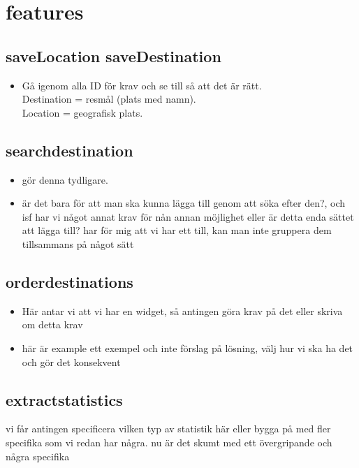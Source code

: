 \documentclass[a4paper]{article}
\begin{document}
\section{features}

	\subsection{saveLocation saveDestination}
		\begin{itemize}
			\item Gå igenom alla ID för krav och se till så att det är rätt.
			\\Destination = resmål (plats med namn).
			\\Location = geografisk plats.
		\end{itemize}


	\subsection{searchdestination}
		\begin{itemize}
			\item gör denna tydligare. 
			\item är det bara för att man ska kunna lägga till genom att söka efter den?, och isf har vi något annat krav för nån annan möjlighet eller är detta enda sättet att lägga till? har för mig att vi har ett till, kan man inte gruppera dem tillsammans på något sätt
		\end{itemize}
		

		
	\subsection{orderdestinations}
		\begin{itemize}
			\item Här antar vi att vi har en widget, så antingen göra krav på det eller skriva om detta krav
			\item här är example ett exempel och inte förslag på lösning, välj hur vi ska ha det och gör det konsekvent
 		
		\end{itemize}
		
	\subsection{extractstatistics}
vi får antingen specificera vilken typ av statistik  här eller bygga på med  fler specifika som vi redan har några. nu är det skumt med ett övergripande och några specifika
\end{document}
